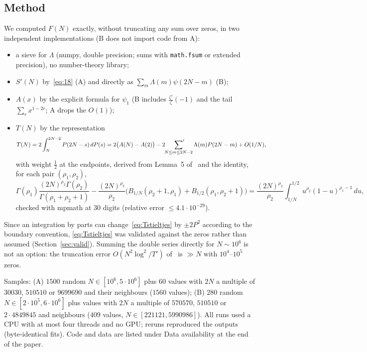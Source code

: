 \documentclass[11pt]{amsart}
\theoremstyle{definition}
\theoremstyle{remark}
\numberwithin{equation}{section}
\newcommand{\Sp}{S'}
\newcommand{\Ca}{\cite{Ca}}
\begin{document}
\subsection{Method}
We computed $F(N)$ exactly, without truncating any sum over zeros, in two independent
implementations (B does not import code from A):
\begin{itemize}
\item a sieve for $\Lambda$ (numpy, double precision; sums with \texttt{math.fsum} or
  extended precision), no number-theory library;
\item $\Sp(N)$ by~\eqref{eq:18} (A) and directly as $\sum_m\Lambda(m)\psi(2N-m)$ (B);
\item $A(x)$ by the explicit formula for $\psi_1$ (B includes $\frac{\zeta'}{\zeta}(-1)$
  and the tail $\sum_r x^{1-2r}$; A drops the $O(1)$);
\item $T(N)$ by the representation
  \begin{equation}\label{eq:Tstieltjes}
    T(N)=2\int_N^{2N-2}P(2N-s)\,dP(s)=2\bigl(A(N)-A(2)\bigr)-2\sideset{}{'}\sum_{N\le m\le 2N-2}\Lambda(m)P(2N-m)+O(1/N),
  \end{equation}
  with weight $\frac12$ at the endpoints, derived from Lemma~5 of~\Ca{} and the identity,
  for each pair $(\rho_1,\rho_2)$,
  \[
    \Gamma(\rho_1)\frac{(2N)^{\rho_2}\Gamma(\rho_2)}{\Gamma(\rho_1+\rho_2+1)}
    -\frac{(2N)^{\rho_2}}{\rho_2}\bigl(B_{1/N}(\rho_2+1,\rho_1)+B_{1/2}(\rho_1,\rho_2+1)\bigr)
    =\frac{(2N)^{\rho_2}}{\rho_2}\int_{1/N}^{1/2}u^{\rho_2}(1-u)^{\rho_1-1}\,du ,
  \]
  checked with mpmath at 30 digits (relative error $\le 4.1\cdot10^{-29}$).
\end{itemize}
Since an integration by parts can change~\eqref{eq:Tstieltjes} by $\pm2P^2$ according to
the boundary convention, \eqref{eq:Tstieltjes} was validated against the zeros rather than
assumed (Section~\ref{sec:valid}). Summing the double series directly for
$N\sim10^6$ is not an option: the truncation error $O(N^2\log^2/T')$ of~\Ca{} is $\gg N$
with $10^4$--$10^5$ zeros.

Samples: (A) $1500$ random $N\in[10^6,5\cdot10^6]$ plus $60$ values with $2N$ a multiple
of $30030$, $510510$ or $9699690$ and their neighbours ($1560$ values); (B) $280$ random
$N\in[2\cdot10^5,6\cdot10^6]$ plus values with $2N$ a multiple of $570570$, $510510$ or
$2\cdot4849845$ and neighbours ($409$ values, $N\in[221121,5990986]$). All runs used a
CPU with at most four threads and no GPU; reruns reproduced the outputs (byte-identical
fits). Code and data are listed under Data availability at the end of the paper.
\end{document}
